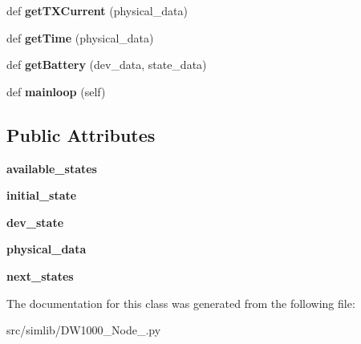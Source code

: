 \begin{DoxyCompactItemize}
def {\bfseries get\+T\+X\+Current} (physical\+\_\+data)
\item 
\mbox{\label{classsimlib_1_1_d_w1000___node__1_1_1_d_w1000___node__1_abee84e59fb3ab499725e235856d74fb0}} 
def {\bfseries get\+Time} (physical\+\_\+data)
\item 
\mbox{\label{classsimlib_1_1_d_w1000___node__1_1_1_d_w1000___node__1_aef9a163f1bdd04786b6320c0d4dc7ae1}} 
def {\bfseries get\+Battery} (dev\+\_\+data, state\+\_\+data)
\item 
\mbox{\label{classsimlib_1_1_d_w1000___node__1_1_1_d_w1000___node__1_a7465f059217e4169dadfbe32d5c503b7}} 
def {\bfseries mainloop} (self)
\end{DoxyCompactItemize}
\subsection*{Public Attributes}
\begin{DoxyCompactItemize}
\item 
\mbox{\label{classsimlib_1_1_d_w1000___node__1_1_1_d_w1000___node__1_a15769611e01424df2e5be1a6e5617f01}} 
{\bfseries available\+\_\+states}
\item 
\mbox{\label{classsimlib_1_1_d_w1000___node__1_1_1_d_w1000___node__1_a4e94a9d2fcc28b105eea6ccc1af5b2da}} 
{\bfseries initial\+\_\+state}
\item 
\mbox{\label{classsimlib_1_1_d_w1000___node__1_1_1_d_w1000___node__1_a3ddec99c33c8dab52b3336e77127e2c5}} 
{\bfseries dev\+\_\+state}
\item 
\mbox{\label{classsimlib_1_1_d_w1000___node__1_1_1_d_w1000___node__1_a9b40a522e2e3c8dd5624b0f4fa7c0b5a}} 
{\bfseries physical\+\_\+data}
\item 
\mbox{\label{classsimlib_1_1_d_w1000___node__1_1_1_d_w1000___node__1_a2fdb8c60ddaa186123fd1a169afc3b23}} 
{\bfseries next\+\_\+states}
\end{DoxyCompactItemize}


The documentation for this class was generated from the following file\+:\begin{DoxyCompactItemize}
\item 
src/simlib/D\+W1000\+\_\+\+Node\+\_.\+py\end{DoxyCompactItemize}
